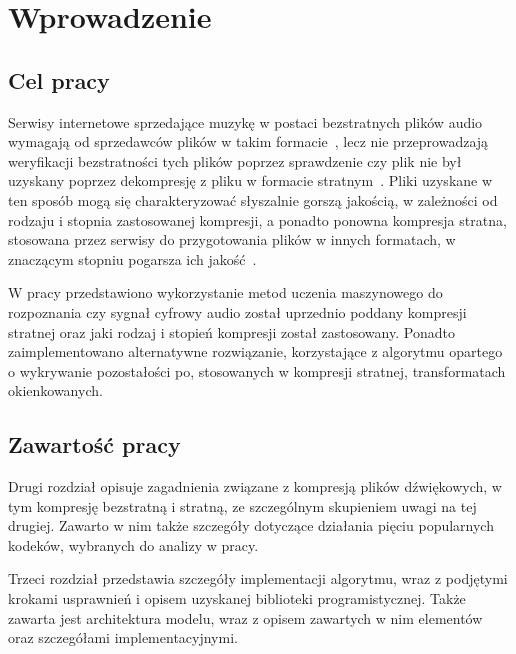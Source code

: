 \documentclass[pl,12pt]{aghdpl}
\author{Szymon Piotr Mikulicz}
\date{\today}
\let\Oldchapter\chapter%
\renewcommand{\chapter}{\FloatBarrier\Oldchapter}
\let\Oldsection\section%
\renewcommand{\section}{\FloatBarrier\Oldsection}
\begin{document}
\titlepages

{%
        \fancyhf{}
        \renewcommand{\headrulewidth}{0pt}
        \renewcommand{\footrulewidth}{0pt}
}

\setcounter{tocdepth}{2}
{\singlespacing\tableofcontents}
\clearpage

\chapter{Wprowadzenie}
\section{Cel pracy}
Serwisy internetowe sprzedające muzykę w postaci bezstratnych plików audio
wymagają od sprzedawców plików w takim formacie~\cite{BCWhyLossless}, lecz nie
przeprowadzają weryfikacji bezstratności tych plików poprzez sprawdzenie czy
plik nie był uzyskany poprzez dekompresję z pliku w formacie stratnym~\cite{ZhouWangJinYan2015}. Pliki uzyskane w ten sposób mogą się charakteryzować
słyszalnie gorszą jakością, w zależności od rodzaju i stopnia zastosowanej
kompresji, a ponadto ponowna kompresja stratna, stosowana przez serwisy do
przygotowania plików w innych formatach, w znaczącym stopniu pogarsza ich jakość~\cite{YangShiHuang2010}.

W pracy przedstawiono wykorzystanie metod uczenia maszynowego do rozpoznania
czy sygnał cyfrowy audio został uprzednio poddany kompresji stratnej oraz jaki
rodzaj i stopień kompresji został zastosowany. Ponadto zaimplementowano
alternatywne rozwiązanie, korzystające z algorytmu opartego o wykrywanie
pozostałości po, stosowanych w kompresji stratnej, transformatach okienkowanych.

\section{Zawartość pracy}
Drugi rozdział opisuje zagadnienia związane z kompresją plików dźwiękowych, w
tym kompresję bezstratną i stratną, ze szczególnym skupieniem uwagi na tej
drugiej. Zawarto w nim także szczegóły dotyczące działania pięciu
popularnych kodeków, wybranych do analizy w pracy.

Trzeci rozdział przedstawia szczegóły implementacji algorytmu, wraz z podjętymi
krokami usprawnień i opisem uzyskanej biblioteki programistycznej. Także
zawarta jest architektura modelu, wraz z opisem zawartych w nim elementów oraz
szczegółami implementacyjnymi.
\end{document}
